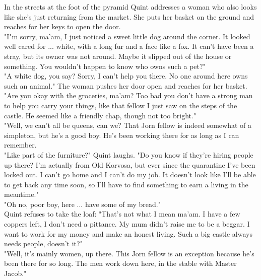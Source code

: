 In the streets at the foot of the pyramid Quint addresses a woman who also looks like she's just returning from the market. She puts her basket on the ground and reaches for her keys to open the door.\\

"I"m sorry, ma'am, I just noticed a sweet little dog around the corner. It looked well cared for ... white, with a long fur and a face like a fox. It can't have been a stray, but its owner was not around. Maybe it slipped out of the house or something. You wouldn't happen to know who owns such a pet?"\\

"A white dog, you say? Sorry, I can't help you there. No one around here owns such an animal." The woman pushes her door open and reaches for her basket.\\

"Are you okay with the groceries, ma'am? Too bad you don't have a strong man to help you carry your things, like that fellow I just saw on the steps of the castle. He seemed like a friendly chap, though not too bright."\\

"Well, we can't all be queens, can we? That Jorn fellow is indeed somewhat of a simpleton, but he's a good boy. He's been working there for as long as I can remember.\\

"Like part of the furniture?" Quint laughs. "Do you know if they're hiring people up there? I'm actually from Old Korvosa, but ever since the quarantine I've been locked out. I can't go home and I can't do my job. It doesn't look like I'll be able to get back any time soon, so I'll have to find something to earn a living in the meantime."\\

"Oh no, poor boy, here ... have some of my bread."\\

Quint refuses to take the loaf: "That's not what I mean ma'am. I have a few coppers left, I don't need a pittance. My mum didn't raise me to be a beggar. I want to work for my money and make an honest living. Such a big castle always needs people, doesn't it?"\\

"Well, it's mainly women, up there. This Jorn fellow is an exception because he's been there for so long. The men work down here, in the stable with Master Jacob."\\

